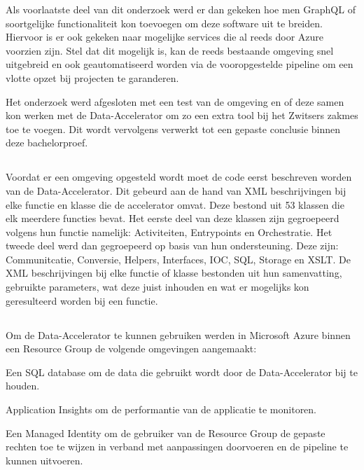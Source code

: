 Als voorlaatste deel van dit onderzoek werd er dan gekeken hoe men GraphQL of soortgelijke functionaliteit kon toevoegen om deze software uit te breiden. Hiervoor is er ook gekeken naar mogelijke services die al reeds door Azure voorzien zijn. Stel dat dit mogelijk is, kan de reeds bestaande omgeving snel uitgebreid en ook geautomatiseerd worden via de vooropgestelde pipeline om een vlotte opzet bij projecten te garanderen.

Het onderzoek werd afgesloten met een test van de omgeving en of deze samen kon werken met de Data-Accelerator om zo een extra tool bij het Zwitsers zakmes toe te voegen. Dit wordt vervolgens verwerkt tot een gepaste conclusie binnen deze bachelorproef.

\subsection{}%
\label{sec:Documentatie}

Voordat er een omgeving opgesteld wordt moet de code eerst beschreven worden van de Data-Accelerator. Dit gebeurd aan de hand van XML beschrijvingen bij elke functie en klasse die de accelerator omvat. Deze bestond uit 53 klassen die elk meerdere functies bevat. Het eerste deel van deze klassen zijn gegroepeerd volgens hun functie namelijk: Activiteiten, Entrypoints en Orchestratie. Het tweede deel werd dan gegroepeerd op basis van hun ondersteuning. Deze zijn: Communitcatie, Conversie, Helpers, Interfaces, IOC, SQL, Storage en XSLT. De XML beschrijvingen bij elke functie of klasse bestonden uit hun samenvatting, gebruikte parameters, wat deze juist inhouden en wat er mogelijks kon geresulteerd worden bij een functie.

\subsection{}%
\label{sec:BICEP}

Om de Data-Accelerator te kunnen gebruiken werden in Microsoft Azure binnen een Resource Group de volgende omgevingen aangemaakt:

Een SQL database om de data die gebruikt wordt door de Data-Accelerator bij te houden.

Application Insights om de performantie van de applicatie te monitoren.

Een Managed Identity om de gebruiker van de Resource Group de gepaste rechten toe te wijzen in verband met aanpassingen doorvoeren en de pipeline te kunnen uitvoeren.

